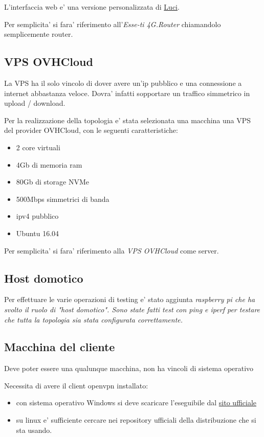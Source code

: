 L'interfaccia web e' una versione personalizzata di \href{https://openwrt.org/docs/guide-user/luci/start}{Luci}.

Per semplicita' si fara' riferimento all'\textit{Esse-ti 4G.Router} chiamandolo semplicemente router.

\subsection{VPS OVHCloud}

La VPS ha il solo vincolo di dover avere un'ip pubblico e una connessione a internet abbastanza veloce. Dovra' infatti sopportare un traffico simmetrico in upload / download.

Per la realizzazione della topologia e' stata selezionata una macchina una VPS del provider OVHCloud, con le seguenti caratteristiche:

\begin{itemize}
	\item 2 core virtuali
	\item 4Gb di memoria ram
	\item 80Gb di storage NVMe
	\item 500Mbps simmetrici di banda
	\item ipv4 pubblico
	\item Ubuntu 16.04
\end{itemize}

Per semplicita' si fara' riferimento alla \textit{VPS OVHCloud} come server.

\subsection{Host domotico}

Per effettuare le varie operazioni di testing e' stato aggiunta \it{raspberry pi} che ha svolto il ruolo di "host domotico". Sono state fatti test con ping e iperf per testare che tutta la topologia sia stata configurata correttamente.


\subsection{Macchina del cliente}

Deve poter essere una qualunque macchina, non ha vincoli di sistema operativo

Necessita di avere il client openvpn installato:

\begin{itemize}
	\item con sistema operativo Windows si deve scaricare l'eseguibile dal \href{https://openvpn.net/client-connect-vpn-for-windows/}{sito ufficiale}
	\item su linux e' sufficiente cercare nei repository ufficiali della distribuzione che si sta usando.
\end{itemize}


